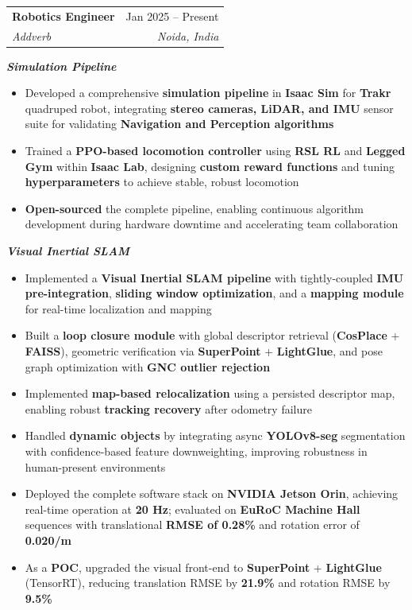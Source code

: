 \documentclass[letterpaper,11pt]{article}
\makeatletter
\newcommand{\resumeItem}[1]{
  \item\small{
    {#1 \vspace{-2pt}}
  }
}
\newcommand{\resumeSubheading}[4]{
  \vspace{-2pt}\item
    \begin{tabular*}{0.97\textwidth}[t]{l@{\extracolsep{\fill}}r}
      \textbf{#1} & #2 \\
      \textit{\small#3} & \textit{\small #4} \\
    \end{tabular*}\vspace{-7pt}
}
\newcommand{\resumeItemListStart}{\begin{itemize}}
\newcommand{\resumeItemListEnd}{\end{itemize}\vspace{-5pt}}
\makeatother
\begin{document}
    \resumeSubheading
      {Robotics Engineer}{Jan 2025 -- Present}
      {Addverb}{Noida, India}
      
    \vspace{2pt}
    \textit{\small \textbf{Simulation Pipeline}}
    \resumeItemListStart
      \resumeItem{Developed a comprehensive \textbf{simulation pipeline} in \textbf{Isaac Sim} for \textbf{Trakr} quadruped robot, integrating \textbf{stereo cameras, LiDAR, and IMU} sensor suite for validating \textbf{Navigation and Perception algorithms}}
      \resumeItem{Trained a \textbf{PPO-based locomotion controller} using \textbf{RSL RL} and \textbf{Legged Gym} within \textbf{Isaac Lab}, designing \textbf{custom reward functions} and tuning \textbf{hyperparameters} to achieve stable, robust locomotion}
    \resumeItem{\textbf{Open-sourced} the complete pipeline, enabling continuous algorithm development during hardware downtime and accelerating team collaboration}
    \resumeItemListEnd
      
\vspace{2pt}
    \textit{\small \textbf{Visual Inertial SLAM}}
    \resumeItemListStart
      \resumeItem{Implemented a \textbf{Visual Inertial SLAM pipeline} with tightly-coupled \textbf{IMU pre-integration}, \textbf{sliding window optimization}, and a \textbf{mapping module} for real-time localization and mapping}
      \resumeItem{Built a \textbf{loop closure module} with global descriptor retrieval (\textbf{CosPlace} + \textbf{FAISS}), geometric verification via \textbf{SuperPoint} + \textbf{LightGlue}, and pose graph optimization with \textbf{GNC outlier rejection}}
      \resumeItem{Implemented \textbf{map-based relocalization} using a persisted descriptor map, enabling robust \textbf{tracking recovery} after odometry failure}
      \resumeItem{Handled \textbf{dynamic objects} by integrating async \textbf{YOLOv8-seg} segmentation with confidence-based feature downweighting, improving robustness in human-present environments}
      \resumeItem{Deployed the complete software stack on \textbf{NVIDIA Jetson Orin}, achieving real-time operation at \textbf{20 Hz}; evaluated on \textbf{EuRoC Machine Hall} sequences with translational \textbf{RMSE of 0.28\%} and rotation error of \textbf{0.020\textdegree/m}}
      \resumeItem{As a \textbf{POC}, upgraded the visual front-end to \textbf{SuperPoint} + \textbf{LightGlue} (TensorRT), reducing translation RMSE by \textbf{21.9\%} and rotation RMSE by \textbf{9.5\%}}
    \resumeItemListEnd
          

\end{document}
